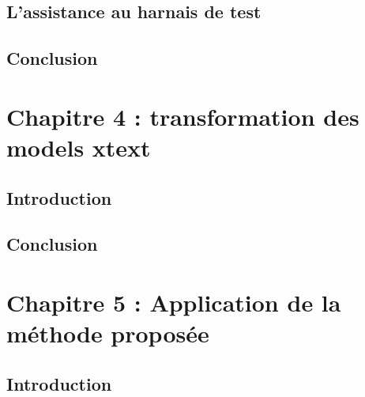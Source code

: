 \documentclass[
10pt, %
a4paper, %
oneside, %
headinclude,footinclude, %
BCOR5mm, %
]{report}
\begin{document}
		\section{L'assistance au harnais de test}
		\lipsum[5] %
		\section{Conclusion}
		\lipsum[10]	
										  
										  
										  
		\newpage 
		\chapter{Chapitre 4 : transformation des models xtext}
		\minitoc  
		\section{Introduction}
		\lipsum[10] %
		\section{Conclusion}
		\lipsum[10]
										  
										  
										  
		\newpage
		\chapter{Chapitre 5 : Application de la méthode proposée  }
		\minitoc  
		\section{Introduction}
		\lipsum[10]
\end{document}
